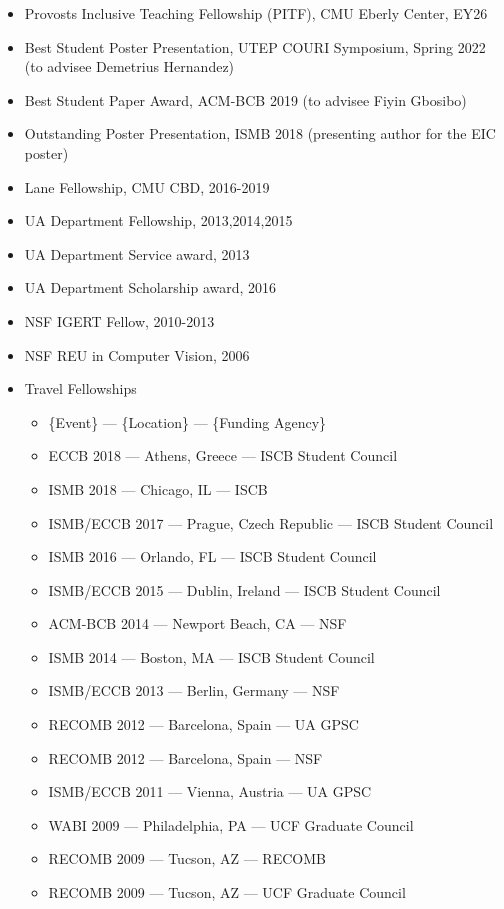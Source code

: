 \documentclass[10pt,letterpaper]{article}
\begin{document}
\begin{itemize}
    \item Provosts Inclusive Teaching Fellowship (PITF), CMU Eberly Center, EY26
    \item Best Student Poster Presentation, UTEP COURI Symposium, Spring 2022 (to advisee Demetrius Hernandez)
    \item Best Student Paper Award, ACM-BCB 2019 (to advisee Fiyin Gbosibo)
    \item Outstanding Poster Presentation, ISMB 2018 (presenting author for the EIC poster)
    \item Lane Fellowship, CMU CBD, 2016-2019
    \item UA Department Fellowship, 2013,2014,2015
    \item UA Department Service award, 2013
    \item UA Department Scholarship award, 2016
    \item NSF IGERT Fellow, 2010-2013
    \item NSF REU in Computer Vision, 2006
    \item Travel Fellowships
    \begin{itemize}
    	\item \{Event\} --- \{Location\} --- \{Funding Agency\}
    	\item ECCB 2018 --- Athens, Greece --- ISCB Student Council
    	\item ISMB 2018 --- Chicago, IL --- ISCB
	\item ISMB/ECCB 2017 --- Prague, Czech Republic --- ISCB Student Council 
	\item ISMB 2016 --- Orlando, FL --- ISCB Student Council
	\item ISMB/ECCB 2015 --- Dublin, Ireland --- ISCB Student Council
	\item ACM-BCB 2014 --- Newport Beach, CA --- NSF
	\item ISMB 2014 --- Boston, MA --- ISCB Student Council 
	\item ISMB/ECCB 2013 --- Berlin, Germany --- NSF
	\item RECOMB 2012 --- Barcelona, Spain --- UA GPSC
	\item RECOMB 2012 --- Barcelona, Spain --- NSF
	\item ISMB/ECCB 2011 --- Vienna, Austria --- UA GPSC
	\item WABI 2009 --- Philadelphia, PA --- UCF Graduate Council 
	\item RECOMB 2009 --- Tucson, AZ --- RECOMB
	\item RECOMB 2009 --- Tucson, AZ --- UCF Graduate Council
    \end{itemize}
\end{itemize}
\end{document}
